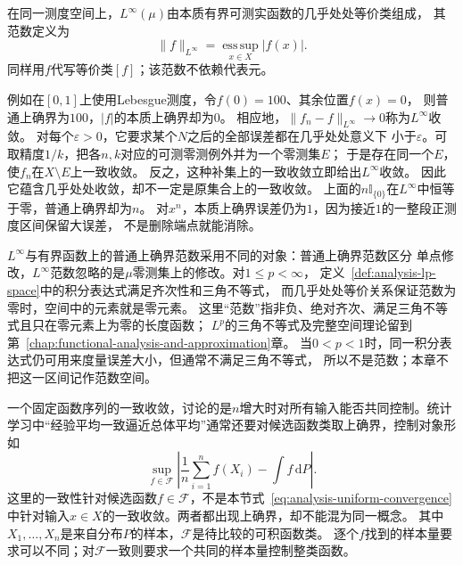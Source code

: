 \begin{definition}
\label{def:analysis-linfty-space}
在同一测度空间上，$L^\infty(\mu)$由本质有界可测实函数的几乎处处等价类组成，
其范数定义为
\begin{equation}
  \lVert f\rVert_{L^\infty}
  =
  \operatorname*{ess\,sup}_{x\in X}|f(x)|.
\label{eq:analysis-essential-supremum-norm}
\end{equation}
同样用$f$代写等价类$[f]$；该范数不依赖代表元。
\end{definition}
例如在$[0,1]$上使用Lebesgue测度，令$f(0)=100$、其余位置$f(x)=0$，
则普通上确界为$100$，$|f|$的本质上确界却为$0$。
相应地，$\lVert f_n-f\rVert_{L^\infty}\to0$称为$L^\infty$收敛。
对每个$\varepsilon>0$，它要求某个$N$之后的全部误差都在几乎处处意义下
小于$\varepsilon$。可取精度$1/k$，把各$n,k$对应的可测零测例外并为一个零测集$E$；
于是存在同一个$E$，使$f_n$在$X\setminus E$上一致收敛。
反之，这种补集上的一致收敛立即给出$L^\infty$收敛。
因此它蕴含几乎处处收敛，却不一定是原集合上的一致收敛。
上面的$n\mathbb I_{\{0\}}$在$L^\infty$中恒等于零，普通上确界却为$n$。
对$x^n$，本质上确界误差仍为$1$，因为接近$1$的一整段正测度区间保留大误差，
不是删除端点就能消除。

$L^\infty$与有界函数上的普通上确界范数采用不同的对象：普通上确界范数区分
单点修改，$L^\infty$范数忽略的是$\mu$零测集上的修改。对$1\leq p<\infty$，
定义~\ref{def:analysis-lp-space}中的积分表达式满足齐次性和三角不等式，
而几乎处处等价关系保证范数为零时，空间中的元素就是零元素。
这里“范数”指非负、绝对齐次、满足三角不等式且只在零元素上为零的长度函数；
$L^p$的三角不等式及完整空间理论留到第~\ref{chap:functional-analysis-and-approximation}章。
当$0<p<1$时，同一积分表达式仍可用来度量误差大小，但通常不满足三角不等式，
所以不是范数；本章不把这一区间记作范数空间。

一个固定函数序列的一致收敛，讨论的是$n$增大时对所有输入能否共同控制。统计学习中“经验平均一致逼近总体平均”通常还要对候选函数类取上确界，控制对象形如
\[   \sup_{f\in\mathcal{F}}   \left|     \frac1n\sum_{i=1}^nf(X_i)-\int f\,\mathrm{d}P   \right|. \]
这里的一致性针对候选函数$f\in\mathcal{F}$，不是本节式~\eqref{eq:analysis-uniform-convergence}中针对输入$x\in X$的一致收敛。两者都出现上确界，却不能混为同一概念。
其中$X_1,\ldots,X_n$是来自分布$P$的样本，$\mathcal F$是待比较的可积函数类。
逐个$f$找到的样本量要求可以不同；对$\mathcal F$一致则要求一个共同的样本量控制整类函数。

